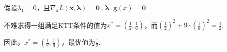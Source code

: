 \documentclass[10pt, a4paper]{article}
\begin{document}
\begin{enumerate}[(a)]
    假设$\lambda_{1}=0$，且$\nabla_{\boldsymbol{x}} L(\boldsymbol{x}, \boldsymbol{\lambda})=\mathbf{0}\,,\,\boldsymbol{\lambda}^{\top} \boldsymbol{g}(x)=\mathbf{0}$

    不难求得一组满足KTT条件的值为$x^{*}=(\frac{1}{2},\frac{1}{6})$，而$\left(\frac{1}{2}\right)^{2}+9 \cdot\left(\frac{1}{6}\right)^{2}=\frac{1}{2}$.

    因此，$x^{*}=(\frac{1}{2},\frac{1}{6})$，最优值为$\frac{1}{2}$.
\end{enumerate}
\end{document}
